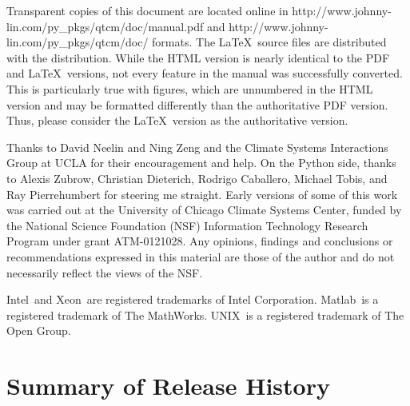 Transparent copies of this document are located online in
%
{%
	{http://www.johnny-lin.com/py_pkgs/qtcm/doc/manual.pdf}}
and
%
{%
	{http://www.johnny-lin.com/py_pkgs/qtcm/doc/}}
formats.
The \LaTeX\ source files are distributed with the 
distribution.
While the HTML version is nearly identical to the PDF
and \LaTeX\ versions, not every feature in the manual was successfully
converted.  This is particularly true with figures, which are
unnumbered in the HTML version and may be formatted differently
than the authoritative PDF version.
Thus, please consider the \LaTeX\ version as the authoritative
version.

\vspace{\baselineskip}

Thanks to David Neelin and Ning Zeng and the Climate Systems
Interactions Group at UCLA for their encouragement and help.
On the Python side,
thanks to Alexis Zubrow, Christian Dieterich, Rodrigo Caballero,
Michael Tobis, and Ray Pierrehumbert for steering me straight.
Early versions of some of this work was carried out 
at the University of Chicago Climate Systems Center, 
funded by the National Science Foundation (NSF) 
Information Technology Research Program under grant ATM-0121028. 
Any opinions, findings and conclusions or recommendations 
expressed in this material are those of the author and 
do not necessarily reflect the views of the NSF.

Intel\textregistered\ and
   Xeon\textregistered\ are registered trademarks of Intel Corporation.
Matlab\textregistered\ is a registered trademark of The MathWorks.
UNIX\textregistered\ is a registered trademark of The Open Group.




\section{Summary of Release History}

